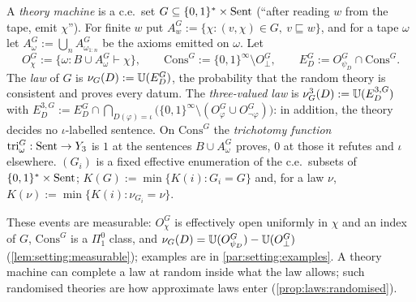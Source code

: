\begin{definition}\label{def:setting:machine}
A \emph{theory machine} is a c.e.\ set $G\subseteq\{0,1\}^*\times\mathrm{Sent}$ (``after reading $w$ from the tape, emit $\chi$''). For finite $w$ put $A^G_w:=\{\chi:(v,\chi)\in G,\ v\sqsubseteq w\}$, and for a tape $\omega$ let $A^G_\omega:=\bigcup_nA^G_{\omega_{1:n}}$ be the axioms emitted on $\omega$. Let
\[
O^G_\chi:=\{\omega:B\cup A^G_\omega\vdash\chi\},\qquad \mathrm{Cons}^G:=\{0,1\}^\infty\setminus O^G_\bot,\qquad E^G_D:=O^G_{\psi_D}\cap\mathrm{Cons}^G .
\]
The \emph{law} of $G$ is $\nu_G(D):=\mathbb{U}(E^G_D)$, the probability that the random theory is consistent and proves every datum. The \emph{three-valued law} is $\nu^3_G(D):=\mathbb{U}(E^{3,G}_D)$ with $E^{3,G}_D:=E^G_D\cap\bigcap_{D(\varphi)=\iota}\big(\{0,1\}^\infty\setminus(O^G_\varphi\cup O^G_{\neg\varphi})\big)$: in addition, the theory decides no $\iota$-labelled sentence. On $\mathrm{Cons}^G$ the \emph{trichotomy function} $\mathrm{tri}^G_\omega:\mathrm{Sent}\to Y_3$ is $1$ at the sentences $B\cup A^G_\omega$ proves, $0$ at those it refutes and $\iota$ elsewhere. $(G_i)$ is a fixed effective enumeration of the c.e.\ subsets of $\{0,1\}^*\times\mathrm{Sent}$; $K(G):=\min\{K(i):G_i=G\}$ and, for a law $\nu$, $K(\nu):=\min\{K(i):\nu_{G_i}=\nu\}$.
\end{definition}

These events are measurable: $O^G_\chi$ is effectively open uniformly in $\chi$ and an index of $G$, $\mathrm{Cons}^G$ is a $\Pi^0_1$ class, and $\nu_G(D)=\mathbb{U}(O^G_{\psi_D})-\mathbb{U}(O^G_\bot)$ (\cref{lem:setting:measurable}); examples are in \cref{par:setting:examples}. A theory machine can complete a law at random inside what the law allows; such randomised theories are how approximate laws enter \SAI (\cref{prop:laws:randomised}).

